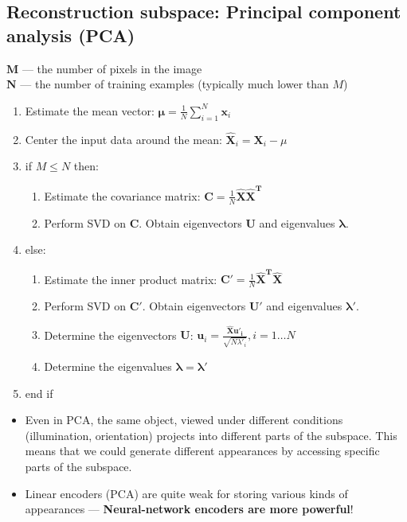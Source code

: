 \documentclass{article}
\begin{document}
    \subsection{Reconstruction subspace: Principal component analysis (PCA)}
    $\mathbf{M}$ --- the number of pixels in the image \\
    $\mathbf{N}$ --- the number of training examples (typically much lower than $M$) 
        
    \begin{enumerate}
        \item Estimate the mean vector: $\mathbf{\mu} = \frac{1}{N} \sum_{i=1}^N \mathbf{x}_i$ 
        \item Center the input data around the mean: $\mathbf{\hat{X}}_i = \mathbf{X}_i - \mu$
        \item if $M \leq N$ then:
        \begin{enumerate}
            \item Estimate the covariance matrix: $\mathbf{C} = \frac{1}{N} \mathbf{\hat{X}\hat{X}^T}$
            \item Perform SVD on $\mathbf{C}$. Obtain eigenvectors $\mathbf{U}$ and eigenvalues $\mathbf{\lambda}$.
        \end{enumerate}
        \item else:
        \begin{enumerate}
            \item Estimate the inner product matrix: $\mathbf{C'} = \frac{1}{N} \mathbf{\hat{X}^T \hat{X}}$
            \item Perform SVD on $\mathbf{C'}$. Obtain eigenvectors $\mathbf{U'}$ and eigenvalues $\mathbf{\lambda'}$.
            \item Determine the eigenvectors $\mathbf{U}$: $\mathbf{u}_i = \frac{\mathbf{\hat{X}u'_i}}{\sqrt{N\lambda'_i}}, i = 1 \ldots N$
            \item Determine the eigenvalues $\mathbf{\lambda} = \mathbf{\lambda'}$
        \end{enumerate}
        \item end if
    \end{enumerate}

    \begin{itemize}
        \item Even in PCA, the same object, viewed under different conditions (illumination, orientation) projects into different parts of the subspace. This means that we could generate different appearances by accessing specific parts of the subspace.
        \item Linear encoders (PCA) are quite weak for storing  various kinds of appearances --- \textbf{Neural-network encoders are more powerful}!
    \end{itemize}
\end{document}
